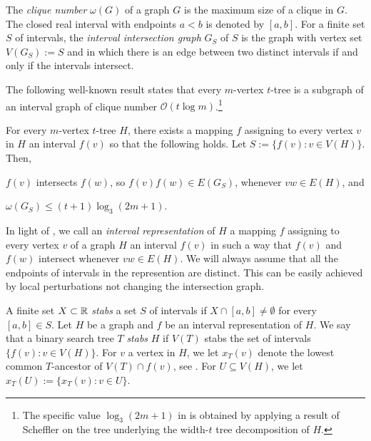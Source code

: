 \documentclass[kpfonts]{patmorin}
\newcommand{\Oh}{\mathcal{O}}
\let\leq\leqslant
\begin{document}
The \emph{clique number} $\omega(G)$ of a graph $G$ is the maximum size of a clique in $G$. The closed real interval with endpoints $a<b$ is denoted by $[a,b]$.
For a finite set $S$ of intervals, 
the \emph{interval intersection graph} $G_S$ of $S$ is the graph 
with vertex set $V(G_S):=S$ and in which there is an edge between two distinct intervals 
if and only if the intervals intersect.

The following well-known result states that every $m$-vertex $t$-tree is a subgraph of an interval graph of clique number $\Oh(t\log m)$.\footnote{The specific value $\log_3 (2m+1)$ in  is obtained by applying a result of Scheffler \cite{scheffler:optimal} on the tree underlying the width-$t$ tree decomposition of $H$.}

\begin{lem}
  For every $m$-vertex $t$-tree $H$, there exists a mapping $f$ assigning to every vertex $v$ in $H$ an interval $f(v)$ so that the following holds. Let $S:=\{f(v):v\in V(H)\}$. Then,
\begin{compactenum}
  \item $f(v)$ intersects $f(w)$, so $f(v)f(w)\in E(G_S)$, whenever $vw\in E(H)$, and 
  \item $\omega(G_S) \leq (t+1)\log_3(2m+1)$.
\end{compactenum}
%
\end{lem}

In light of , we call an \emph{interval representation} of $H$ 
a mapping $f$ assigning to every vertex $v$ of a graph $H$ an interval $f(v)$ in such a way that $f(v)$ and $f(w)$ intersect whenever $vw\in E(H)$.
We will always assume that all the endpoints of intervals in the represention are distinct. 
This can be easily achieved by local perturbations not changing the intersection graph.

A finite set $X\subset\mathbb{R}$ \emph{stabs} a set $S$ of intervals if $X\cap [a,b]\neq\emptyset$ for every $[a,b]\in S$.
Let $H$ be a graph and $f$ be an interval representation of $H$. 
We say that a binary search tree $T$ \emph{stabs} $H$ if $V(T)$ stabs the set of intervals $\{f(v):v\in V(H)\}$. 
For $v$ a vertex in $H$, we let $x_T(v)$ denote the lowest common $T$-ancestor of $V(T)\cap f(v)$, see .
For $U \subseteq V(H)$, we let $x_T(U):=\{x_T(v):v\in U\}$.
\end{document}
